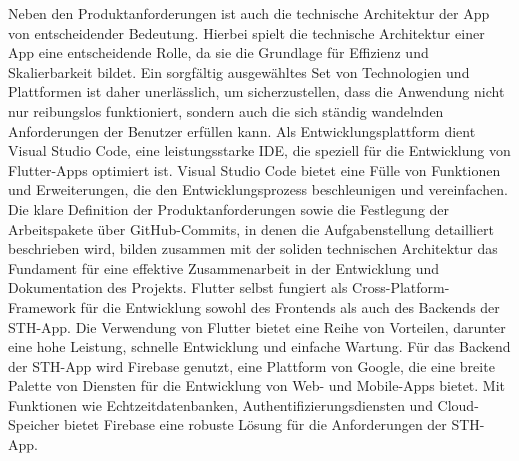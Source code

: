 Neben den Produktanforderungen ist auch die technische Architektur der App von entscheidender Bedeutung. Hierbei spielt die technische Architektur einer App eine entscheidende Rolle, da sie die Grundlage für Effizienz und Skalierbarkeit bildet.
Ein sorgfältig ausgewähltes Set von Technologien und Plattformen ist daher unerlässlich, um sicherzustellen, dass die Anwendung nicht nur reibungslos funktioniert, sondern auch die sich ständig wandelnden Anforderungen der Benutzer erfüllen kann.
Als Entwicklungsplattform dient Visual Studio Code, eine leistungsstarke IDE, die speziell für die Entwicklung von Flutter-Apps optimiert ist. Visual Studio Code bietet eine Fülle von Funktionen und Erweiterungen, die den Entwicklungsprozess beschleunigen und vereinfachen.
Die klare Definition der Produktanforderungen sowie die Festlegung der Arbeitspakete über GitHub-Commits, in denen die Aufgabenstellung detailliert beschrieben wird, bilden zusammen mit der soliden technischen Architektur das Fundament für eine effektive Zusammenarbeit in der Entwicklung und Dokumentation des Projekts.
Flutter selbst fungiert als Cross-Platform-Framework für die Entwicklung sowohl des Frontends als auch des Backends der STH-App. Die Verwendung von Flutter bietet eine Reihe von Vorteilen, darunter eine hohe Leistung, schnelle Entwicklung und einfache Wartung.
Für das Backend der STH-App wird Firebase genutzt, eine Plattform von Google, die eine breite Palette von Diensten für die Entwicklung von Web- und Mobile-Apps bietet. Mit Funktionen wie Echtzeitdatenbanken, Authentifizierungsdiensten und Cloud-Speicher bietet Firebase eine robuste Lösung für die Anforderungen der STH-App.
